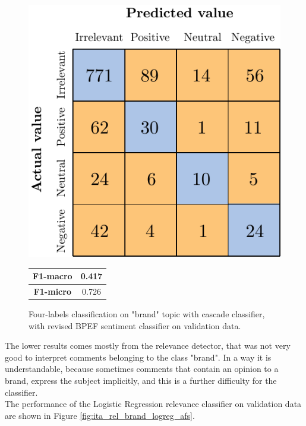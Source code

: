 \begin{figure}[H]
	\begin{minipage}[b]{0.6\linewidth}
		\centering
		\includegraphics[scale=1]{figures/conf_matrices/ita_brand/ita_cascade_brand_bpef_val.pdf}
	\end{minipage}
	\begin{minipage}[b]{0.3\linewidth}
		\begin{tabular}[b]{ | c | c | } 
			\hline
			\textbf{F1-macro} & 0.417 \\
			\hline
			\textbf{F1-micro} & 0.726 \\ 
			\hline
		\end{tabular}
	\end{minipage}
	\caption{Four-labels classification on "brand" topic with cascade classifier, with revised BPEF sentiment classifier on validation data.}
	\label{fig:ita_cascade_brand_bpef_val}
\end{figure}


The lower results comes mostly from the relevance detector, that was not very good to interpret comments belonging to the class "brand". In a way it is understandable, because sometimes comments that contain an opinion to a brand, express the subject implicitly, and this is a further difficulty for the classifier.\\
The performance of the Logistic Regression relevance classifier on validation data are shown in Figure \ref{fig:ita_rel_brand_logreg_afs}.

